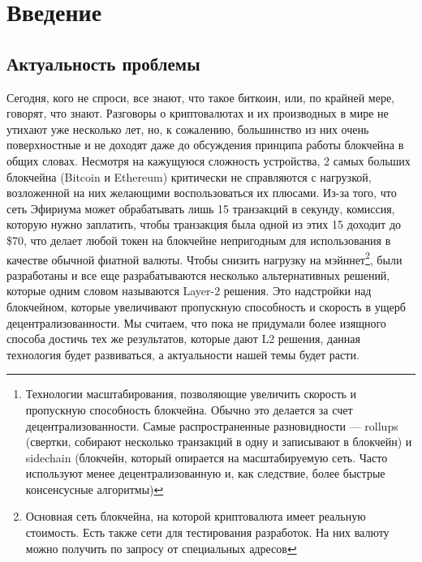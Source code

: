 \documentclass{article}
\begin{document}
\makeTitlePage

\tableofcontents

\begin{abstract}
Исследование и написание торговых стратегия для децентрализованных бирж на Layer-2\footnote{Технологии масштабирования, позволяющие увеличить скорость и пропускную способность блокчейна. Обычно это делается за счет децентрализованности. Самые распространенные разновидности — rollups (свертки, собирают несколько транзакций в одну и записывают в блокчейн) и sidechain (блокчейн, который опирается на масштабируемую сеть. Часто используют менее децентрализованную и, как следствие, более быстрые консенсусные алгоритмы)}.
\end{abstract}


\section{Введение}

\subsection{Актуальность проблемы}
Сегодня, кого не спроси, все знают, что такое биткоин, или, по крайней мере, говорят, что знают. Разговоры о криптовалютах и их производных в мире не утихают уже несколько лет, но, к сожалению, большинство из них очень поверхностные и не доходят даже до обсуждения принципа работы блокчейна в общих словах.
Несмотря на кажущуюся сложность устройства, 2 самых больших блокчейна (Bitcoin и Ethereum) критически не справляются с нагрузкой, возложенной на них желающими воспользоваться их плюсами. Из-за того, что сеть Эфириума может обрабатывать лишь 15 транзакций в секунду, комиссия, которую нужно заплатить, чтобы транзакция была одной из этих 15 доходит до \$70, что делает любой токен на блокчейне непригодным для использования в качестве обычной фиатной валюты. Чтобы снизить нагрузку на мэйннет\footnote{Основная сеть блокчейна, на которой криптовалюта имеет реальную стоимость. Есть также сети для тестирования разработок. На них валюту можно получить по запросу от специальных адресов}, были разработаны и все еще разрабатываются несколько альтернативных решений, которые одним словом называются Layer-2 решения. Это надстройки над блокчейном, которые увеличивают пропускную способность и скорость в ущерб децентрализованности.
Мы считаем, что пока не придумали более изящного способа достичь тех же результатов, которые дают L2 решения, данная технология будет развиваться, а актуальности нашей темы будет расти.
\end{document}
